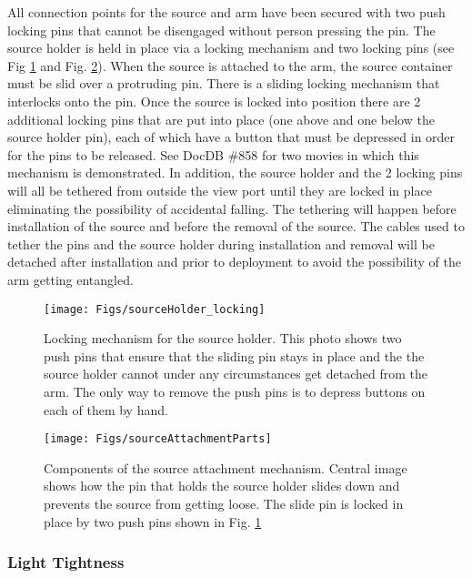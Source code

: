 \begin{itemize}
All connection points for the source and arm have been secured with two push locking pins that cannot be disengaged without person pressing the pin. 
The source holder is held in place via a locking mechanism and two locking pins (see Fig \ref{fig:sourceHolder_locking} and Fig. \ref{fig:sourceAttachmentParts}).  When the source is attached to the arm, the source container must be slid over a protruding pin. There is a sliding locking mechanism that interlocks onto the pin. Once the source is locked into position there are 2 additional locking pins that are put into place (one above and one below the source holder pin), each of which have a button that must be depressed in order for the pins to be released.  See DocDB \#858 for two movies in which this mechanism is demonstrated. In addition, the source holder and the 2 locking pins will all be tethered from outside the view port until they are locked in place eliminating the possibility of accidental falling.  The tethering will happen before installation of the source and before the removal of the source. The cables used to tether the pins and the source holder during installation and removal will be detached after installation and prior to deployment to avoid the possibility of the arm getting entangled.  
 
\begin{figure}[htbp]
 \centering
 \texttt{[image: Figs/sourceHolder\_locking]}
 \caption{Locking mechanism for the source holder. This photo shows two push pins that ensure that the sliding pin stays in place and the the source holder cannot under any circumstances get detached from the arm.  The only way to remove the push pins is to depress buttons on each of them by hand. }
 \label{fig:sourceHolder_locking}
\end{figure}

\begin{figure}[htbp]
 \centering
  \texttt{[image: Figs/sourceAttachmentParts]}
  \caption{Components of the source attachment mechanism. Central image shows how the pin that holds the source holder slides down and prevents the source from getting loose.  The slide pin is locked in place by two push pins shown in Fig. \ref{fig:sourceHolder_locking}}
  \label{fig:sourceAttachmentParts}
\end{figure}

\end{itemize}

 \subsubsection{Light Tightness}
 
